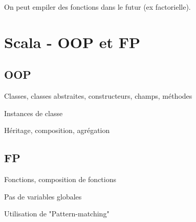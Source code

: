 \documentclass[french]{article}
\begin{document}
On peut empiler des fonctions dans le futur (ex factorielle).


\section{Scala - OOP et FP}

\subsection{OOP}

Classes, classes abstraites, constructeurs, champs, méthodes

Instances de classe

Héritage, composition, agrégation

\subsection{FP}

Fonctions, composition de fonctions

Pas de variables globales

Utilisation de "Pattern-matching"
\end{document}
